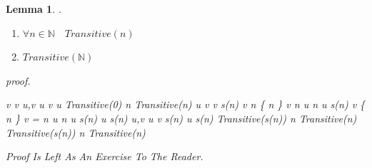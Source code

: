 \documentclass[10pt,a4paper]{book}
\let\emptyset\varnothing
\newtheorem{lemma}{Lemma}[section]
\begin{document}
\begin{lemma}.\\
    \begin{enumerate}
        \setlength{\itemsep}{0pt} %
        \item       $\forall n \in \mathbb{N} \quad  Transitive(n)  $
        \item       $Transitive( \mathbb{N})$  
    \end{enumerate}

    proof.
    \begin{fitchproof}[arrayenv=tabular]

         { \forall v \quad  v     }                           \by{$def \emptyset $}{}
         { \forall u,v \quad u \in v   \to u   }                           
         {  Transitive(0) }                           
        \open
         {n\in {} }                                   
        \open
         {  Transitive(n) }                          
        \open
         { u \in v \land v \in s(n)    }                            
         {  v \in n \cup \{ n \}    }                           
        \open
         {  v \in n    }                           
         { u \in n   }                            
         {  u \in s(n)  }                           
        \close
        \open
         {  v \in \{ n \}    }                           
         {  v = n    }                           \by{$  $}{}
         { u \in n   }                            
         {  u \in s(n)  }                           
        \close
         {  u \in s(n)  }                           \by{$ $}{}
        \close
         { \forall u,v \quad u \in v \in s(n)  \to u \in s(n)  }                           \by{$ $}{}
         {  Transitive(s(n)) }                           \by{$ $}{}
        \close
        \close
         {\forall n \in {} \quad  Transitive(n) \to Transitive(s(n)) }
         {\forall n \in {} \quad  Transitive(n) }                                   

    \end{fitchproof}
    Proof Is Left As An Exercise To The Reader.
\end{lemma}
\end{document}
